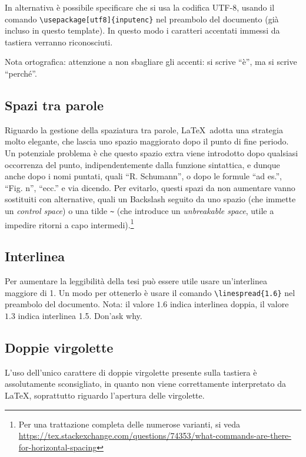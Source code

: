 \documentclass[12pt]{report}
\begin{document}
In alternativa \`e possibile specificare che si usa la codifica UTF-8, usando il comando \verb|\usepackage[utf8]{inputenc}| nel preambolo del documento (già incluso in questo template). In questo modo i caratteri accentati immessi da tastiera verranno riconosciuti.

Nota ortografica: attenzione a non sbagliare gli accenti: si scrive ``\`e'', ma si scrive ``perch\'e''.

\subsection{Spazi tra parole}

Riguardo la gestione della spaziatura tra parole, \LaTeX\ adotta una strategia molto elegante, che lascia uno spazio maggiorato dopo il punto di fine periodo. Un potenziale problema è che questo spazio extra viene introdotto dopo qualsiasi occorrenza del punto, indipendentemente dalla funzione sintattica, e dunque anche dopo i nomi puntati, quali ``R. Schumann'', o dopo le formule ``ad es.'', ``Fig. n'', ``ecc.'' e via dicendo. Per evitarlo, questi spazi da non aumentare vanno sostituiti con alternative, quali un Backslash seguito da uno spazio (che immette un \textit{control space}) o una tilde \verb|~| (che introduce un \textit{unbreakable space}, utile a impedire ritorni a capo intermedi).\footnote{Per una trattazione completa delle numerose varianti, si veda \url{https://tex.stackexchange.com/questions/74353/what-commands-are-there-for-horizontal-spacing}}

\subsection{Interlinea}

Per aumentare la leggibilit\`a della tesi pu\`o essere utile usare un'interlinea maggiore di 1. Un modo per ottenerlo \`e usare il comando \verb|\linespread{1.6}| nel preambolo del documento. Nota: il valore $1.6$ indica interlinea doppia, il valore $1.3$ indica interlinea 1.5. Don'ask why.


\subsection{Doppie virgolette}

L'uso dell'unico carattere di doppie virgolette presente sulla tastiera è assolutamente sconsigliato, in quanto non viene correttamente interpretato da \LaTeX, soprattutto riguardo l'apertura delle virgolette.
\end{document}
